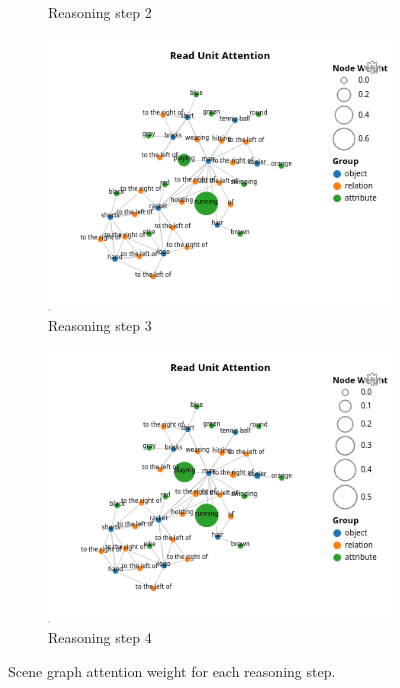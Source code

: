 \begin{figure}[htbp]
\begin{subfigure}[r]{0.49\textwidth}
        \caption{Reasoning step 2}
    \end{subfigure}
    \begin{subfigure}[l]{0.49\textwidth}
        \includegraphics[width=\textwidth]{figures/negative_ambiguous/negative_ambiguous_read_attn_2.png}
        \caption{Reasoning step 3}
    \end{subfigure}
    \begin{subfigure}[r]{0.49\textwidth}
        \includegraphics[width=\textwidth]{figures/negative_ambiguous/negative_ambiguous_read_attn_3.png}
        \caption{Reasoning step 4}
    \end{subfigure}
    \caption[Scene graph attention weight for each reasoning step.]{Scene graph attention weight for each reasoning step.}
    \label{fig:negative_ambiguous_read_attn}
\end{figure}



